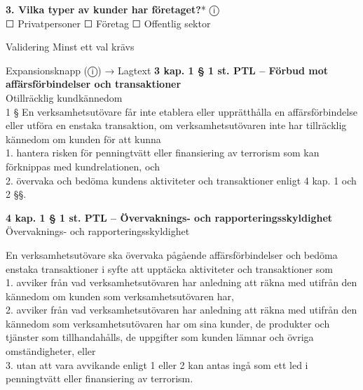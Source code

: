 \documentclass[10pt]{beamer}
\begin{document}
\begin{frame}[label=riskfragor-steg1]
  \textbf{3. Vilka typer av kunder har företaget?}* \hspace{0.3cm} ⓘ\\
  \tiny
  ☐ Privatpersoner \hspace{0.5cm} ☐ Företag \hspace{0.5cm} ☐ Offentlig sektor
  \begin{block}{Validering}
    \tiny Minst ett val krävs
  \end{block}
  \begin{alertblock}{Expansionsknapp (ⓘ) → Lagtext}
    \tiny \textbf{3 kap. 1 § 1 st. PTL – Förbud mot affärsförbindelser och transaktioner}\\

    \tiny Otillräcklig kundkännedom\\

    \tiny 1 §   En verksamhetsutövare får inte etablera eller upprätthålla en affärsförbindelse eller 
    utföra en enstaka transaktion, om verksamhetsutövaren inte har tillräcklig kännedom om kunden 
    för att kunna\\
    \tiny 1. hantera risken för penningtvätt eller finansiering av terrorism som kan förknippas 
    med kundrelationen, och\\
    \tiny 2. övervaka och bedöma kundens aktiviteter och transaktioner enligt 4 kap. 1 och 2 §§.
    \vspace{0.1cm}

    \tiny \textbf{4 kap. 1 § 1 st. PTL – Övervaknings- och rapporteringsskyldighet}\\
    \tiny Övervaknings- och rapporteringsskyldighet

    \tiny En verksamhetsutövare ska övervaka pågående affärsförbindelser och bedöma enstaka 
    transaktioner i syfte att upptäcka aktiviteter och transaktioner som\\
    \tiny 1. avviker från vad verksamhetsutövaren har anledning att räkna med utifrån den kännedom om 
    kunden som verksamhetsutövaren har,\\
    \tiny 2. avviker från vad verksamhetsutövaren har anledning att räkna med utifrån den kännedom 
    som verksamhetsutövaren har om sina kunder, de produkter och tjänster som tillhandahålls, 
    de uppgifter som kunden lämnar och övriga omständigheter, eller\\
    \tiny 3. utan att vara avvikande enligt 1 eller 2 kan antas ingå som ett led i penningtvätt 
    eller finansiering av terrorism.
    \vspace{0.1cm}


\end{alertblock}
\end{frame}
\end{document}
